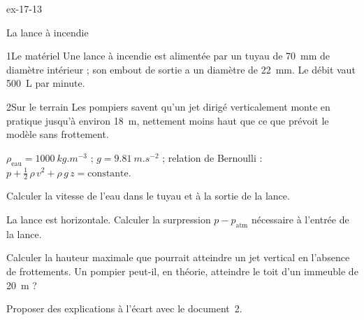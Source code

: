 \begin{blocLivre}{ex-17-13}
\begin{exercice}[3]{La lance à incendie}
\begin{docu}{1}{Le matériel}
Une lance à incendie est alimentée par un tuyau de \qty{70}{mm} de diamètre intérieur ; son embout de sortie a un
diamètre de \qty{22}{mm}. Le débit vaut \qty{500}{L} par minute.
\end{docu}
\begin{docu}{2}{Sur le terrain}
Les pompiers savent qu'un jet dirigé verticalement monte en pratique jusqu'à environ \qty{18}{m}, nettement moins
haut que ce que prévoit le modèle sans frottement.
\end{docu}
\begin{donnees}
$\rho_\mathrm{eau}=\qty{1000}{kg.m^{-3}}$ ; $g=\qty{9,81}{m.s^{-2}}$ ; relation de Bernoulli :
$p+\frac12\,\rho\,v^2+\rho\,g\,z=\text{constante}$.
\end{donnees}
\begin{questions}
\item Calculer la vitesse de l'eau dans le tuyau et à la sortie de la lance.
\item La lance est horizontale. Calculer la surpression $p-p_\mathrm{atm}$ nécessaire à l'entrée de la lance.
\item \initiative Calculer la hauteur maximale que pourrait atteindre un jet vertical en l'absence de frottements. Un
pompier peut-il, en théorie, atteindre le toit d'un immeuble de \qty{20}{m} ?
\item Proposer des explications à l'écart avec le document~2.
\end{questions}
\end{exercice}
\end{blocLivre}
